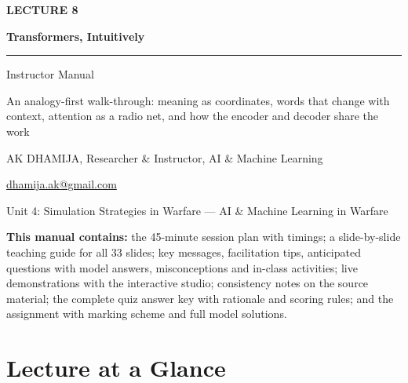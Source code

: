 \documentclass[11pt]{article}
\begin{document}
\begin{titlepage}\centering\vspace*{2.2cm}
{\color{AccN}\large\bfseries LECTURE 8\par}\vspace{0.6cm}
{\color{NavyN}\Huge\bfseries Transformers, Intuitively\par}\vspace{0.6cm}
{\color{AccN}\rule{0.7\textwidth}{1.5pt}}\par\vspace{0.6cm}
{\LARGE Instructor Manual\par}\vspace{0.4cm}
{\large\begin{minipage}{0.85\textwidth}\centering An analogy-first walk-through: meaning as coordinates, words that change with context, attention as a radio net, and how the encoder and decoder share the work\end{minipage}\par}\vspace{2cm}
{\large AK DHAMIJA, Researcher \& Instructor, AI \& Machine Learning\par}\vspace{0.2cm}
{\normalsize \href{mailto:dhamija.ak@gmail.com}{dhamija.ak@gmail.com} \quad\textbullet{}\par}\vspace{0.3cm}
{Unit 4: Simulation Strategies in Warfare --- AI \& Machine Learning in Warfare\par}\vfill
\begin{tcolorbox}[colback=NavyN!4,colframe=NavyN,boxrule=0.6pt,arc=2pt,width=0.9\textwidth]\small
\textbf{This manual contains:} the 45-minute session plan with timings; a slide-by-slide teaching guide for all 33 slides; key messages, facilitation tips, anticipated questions with model answers, misconceptions and in-class activities; live demonstrations with the interactive studio; consistency notes on the source material; the complete quiz answer key with rationale and scoring rules; and the assignment with marking scheme and full model solutions.
\end{tcolorbox}
\end{titlepage}
\tableofcontents\newpage


\section{Lecture at a Glance}
\end{document}
